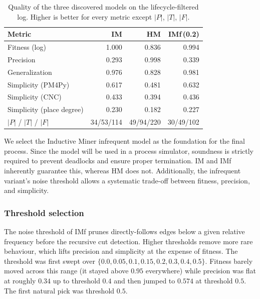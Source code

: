 \documentclass[
  english,        %
  font=times,     %
  twocolumn,      %
]{tumarticle}
\begin{document}
\begin{table}[h]
    \caption{Quality of the three discovered models on the lifecycle-filtered log. Higher is better for every metric except $|P|$, $|T|$, $|F|$.}
    \centering
    \footnotesize
    \setlength{\tabcolsep}{4pt}
    \begin{tabular}{lrrr}
        \toprule
        \textbf{Metric}             & \textbf{IM} & \textbf{HM} & \textbf{IMf}\,(0.2) \\
        \midrule
        Fitness (log)               & 1.000 & 0.836 & 0.994 \\
        Precision                   & 0.293 & 0.998 & 0.339 \\
        Generalization              & 0.976 & 0.828 & 0.981 \\
        Simplicity (PM4Py)          & 0.617 & 0.481 & 0.632 \\
        Simplicity (CNC)            & 0.433 & 0.394 & 0.436 \\
        Simplicity (place degree)   & 0.230 & 0.182 & 0.227 \\
        \midrule
        $|P|$ / $|T|$ / $|F|$       & 34/53/114 & 49/94/220 & 30/49/102 \\
        \bottomrule
    \end{tabular}
    \label{tab:models}
\end{table}

We select the Inductive Miner infrequent model as the foundation for the final process. Since the model will be used in a process simulator, soundness is strictly required to prevent deadlocks and ensure proper termination. IM and IMf inherently guarantee this, whereas HM does not. Additionally, the infrequent variant's noise threshold allows a systematic trade-off between fitness, precision, and simplicity.

\subsubsection*{Threshold selection}\label{sec:sweep}

The noise threshold of IMf prunes directly-follows edges below a given relative frequency before the recursive cut detection. Higher thresholds remove more rare behaviour, which lifts precision and simplicity at the expense of fitness. The threshold was first swept over $\{0.0, 0.05, 0.1, 0.15, 0.2, 0.3, 0.4, 0.5\}$. Fitness barely moved across this range (it stayed above $0.95$ everywhere) while precision was flat at roughly $0.34$ up to threshold $0.4$ and then jumped to $0.574$ at threshold $0.5$. The first natural pick was threshold $0.5$.
\end{document}
